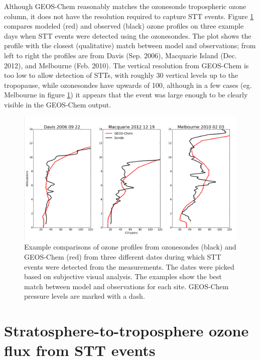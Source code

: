 \documentclass{article}
\begin{document}
  Although GEOS-Chem reasonably matches the ozonesonde tropospheric ozone column, it does not have the resolution required to capture STT events.
  Figure \ref{fig:event_profile_comparison} compares modeled (red) and observed (black) ozone profiles on three example days when STT events were detected using the ozonesondes. 
  The plot shows the profile with the closest (qualitative) match between model and observations; from left to right the profiles are from Davis (Sep. 2006), Macquarie Island (Dec. 2012), and Melbourne (Feb. 2010).
  The vertical resolution from GEOS-Chem is too low to allow detection of STTs, with roughly 30 vertical levels up to the tropopause, while ozonesondes have upwards of 100, although in a few cases (eg. Melbourne in figure \ref{fig:event_profile_comparison}) it appears that the event was large enough to be clearly visible in the GEOS-Chem output.
  
  \begin{figure}[!htbp]
    \includegraphics[width=\textwidth]{figures/event_profile_comparison.png}
    \caption{Example comparisons of ozone profiles from ozonesondes (black) and GEOS-Chem (red) from 		  three different dates during which STT events were detected from the measurements.
      The dates were picked based on subjective visual analysis. 
      The examples show the best match between model and observations for each site.
      GEOS-Chem pressure levels are marked with a dash.}
    \label{fig:event_profile_comparison}
  \end{figure}
  
\section{Stratosphere-to-troposphere ozone flux from STT events}
  
\end{document}
